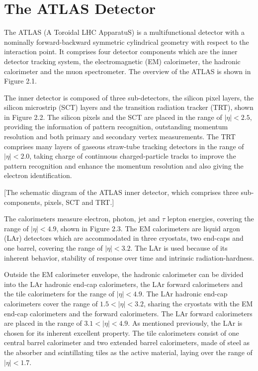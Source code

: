 \documentclass[class=NTHU_thesis, crop=false]{standalone}
\begin{document}
\chapter{The ATLAS Detector}
The ATLAS (A Toroidal LHC ApparatuS) is a multifunctional detector with a nominally forward-backward symmetric cylindrical geometry with respect to the interaction point. It comprises four detector components which are the inner detector tracking system, the electromagnetic (EM) calorimeter, the hadronic calorimeter and the muon spectrometer. The overview of the ATLAS is shown in Figure 2.1.


The inner detector is composed of three sub-detectors, the silicon pixel layers, the silicon microstrip (SCT) layers and the transition radiation tracker (TRT), shown in Figure 2.2. The silicon pixels and the SCT are placed in the range of $\left|\eta\right| < 2.5$, providing the information of pattern recognition, outstanding momentum resolution and both primary and secondary vertex measurements. The TRT comprises many layers of gaseous straw-tube tracking detectors in the range of $\left|\eta\right| < 2.0$, taking charge of continuous charged-particle tracks to improve the pattern recognition and enhance the momentum resolution and also giving the electron identification.

[The schematic diagram of the ATLAS inner detector, which comprises three sub-components, pixels, SCT and TRT.]

The calorimeters measure electron, photon, jet and $\tau$ lepton energies, covering the range of $\left|\eta\right| < 4.9$, shown in Figure 2.3. The EM calorimeters are liquid argon (LAr) detectors which are accommodated in three cryostats, two end-caps and one barrel, covering the range of $\left|\eta\right| < 3.2$. The LAr is used because of its inherent behavior, stability of response over time and intrinsic radiation-hardness.

Outside the EM calorimeter envelope, the hadronic calorimeter can be divided into the LAr hadronic end-cap calorimeters, the LAr forward calorimeters and the tile calorimeters for the range of $\left|\eta\right| < 4.9$. The LAr hadronic end-cap calorimeters cover the range of $1.5 < \left|\eta\right| < 3.2$, sharing the cryostats with the EM end-cap calorimeters and the forward calorimeters. The LAr forward calorimeters are placed in the range of $3.1 < \left|\eta\right| < 4.9$. As mentioned previously, the LAr is chosen for its inherent excellent property. The tile calorimeters consist of one central barrel calorimeter and two extended barrel calorimeters, made of steel as the absorber and scintillating tiles as the active material, laying over the range of $\left|\eta\right| < 1.7$.
\end{document}
